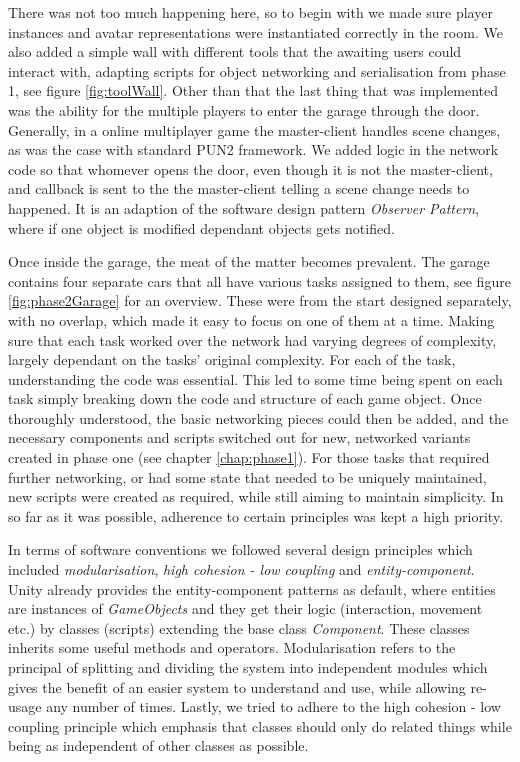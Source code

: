 There was not too much happening here, so to begin with we made sure player instances and avatar representations were instantiated correctly in the room. We also added a simple wall with different tools that the awaiting users could interact with, adapting scripts for object networking and serialisation from phase 1, see figure \ref{fig:toolWall}. Other than that the last thing that was implemented was the ability for the multiple players to enter the garage through the door. Generally, in a online multiplayer game the master-client  handles scene changes, as was the case with standard PUN2 framework. We added logic in the network code so that whomever opens the door, even though it is not the master-client, and callback is sent to the the master-client telling a scene change needs to happened. It is an adaption of the software design pattern \textit{Observer Pattern}, where if one object is modified dependant objects gets notified.    



Once inside the garage, the meat of the matter becomes prevalent. The garage contains four separate cars that all have various tasks assigned to them, see figure \ref{fig:phase2Garage} for an overview. These were from the start designed separately, with no overlap, which made it easy to focus on one of them at a time. Making sure that each task worked over the network had varying degrees of complexity, largely dependant on the tasks' original complexity. For each of the task, understanding the code was essential. This led to some time being spent on each task simply breaking down the code and structure of each game object. Once thoroughly understood, the basic networking pieces could then be added, and the necessary components and scripts switched out for new, networked variants created in phase one (see chapter \ref{chap:phase1}). For those tasks that required further networking, or had some state that needed to be uniquely maintained, new scripts were created as required, while still aiming to maintain simplicity.  In so far as it was possible, adherence to certain principles was kept a high priority. 

In terms of software conventions we followed several design principles which included \textit{ modularisation}, \textit{high cohesion - low coupling} and \textit{ entity-component}. Unity already provides the entity-component patterns as default, where entities are instances of \textit{GameObjects} and they get their logic (interaction, movement etc.) by classes (scripts) extending the base class \textit{Component}. These classes inherits some useful methods and operators. 
Modularisation refers to the principal of splitting and dividing the system into independent modules which gives the benefit of an easier system to understand and use, while allowing re-usage any number of times. Lastly, we tried to adhere to the high cohesion - low coupling principle which emphasis that classes should only do related things while being as independent of other classes as possible.    

